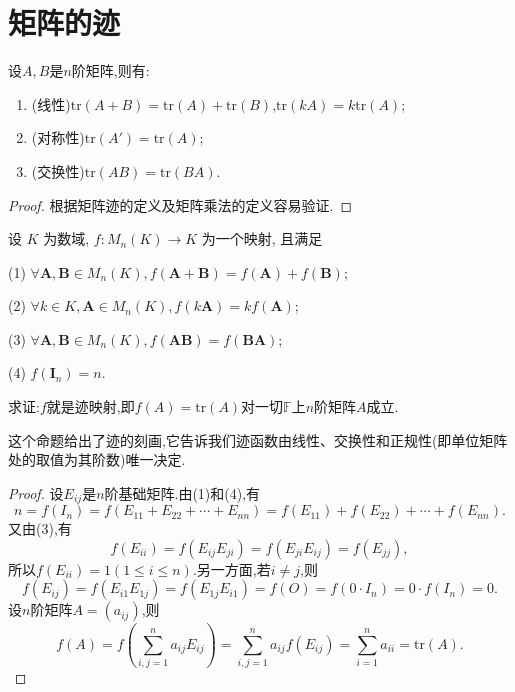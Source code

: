 \documentclass[../../main.tex]{subfiles}
\begin{document}
\section{矩阵的迹}

\begin{proposition}[矩阵迹的性质]\label{proposition:矩阵矩阵迹的性质}
设\(A,B\)是\(n\)阶矩阵,则有:
\begin{enumerate}
\item (线性)\(\mathrm{tr}(A + B)=\mathrm{tr}(A)+\mathrm{tr}(B)\),\(\mathrm{tr}(kA)=k\mathrm{tr}(A)\);
\item (对称性)\(\mathrm{tr}(A')=\mathrm{tr}(A)\);
\item (交换性)\(\mathrm{tr}(AB)=\mathrm{tr}(BA)\).
\end{enumerate}
\end{proposition}
\begin{proof}
根据矩阵迹的定义及矩阵乘法的定义容易验证.

\end{proof}

\begin{proposition}[矩阵迹的刻画]\label{proposition:矩阵迹的刻画}
设 \( K \) 为数域, \( f: M_n(K) \to K \) 为一个映射, 且满足

(1) \( \forall \boldsymbol{A}, \boldsymbol{B} \in M_n(K), f(\boldsymbol{A} + \boldsymbol{B}) = f(\boldsymbol{A}) + f(\boldsymbol{B}) \);

(2) \( \forall k \in K, \boldsymbol{A} \in M_n(K), f(k\boldsymbol{A}) = kf(\boldsymbol{A}) \);

(3) \( \forall \boldsymbol{A}, \boldsymbol{B} \in M_n(K), f(\boldsymbol{AB}) = f(\boldsymbol{BA}) \);

(4) \( f(\boldsymbol{I}_n) = n \).

求证:\(f\)就是迹映射,即\(f(A)=\mathrm{tr}(A)\)对一切\(\mathbb{F}\)上\(n\)阶矩阵\(A\)成立.
\end{proposition}
\begin{note}
这个命题给出了迹的刻画,它告诉我们迹函数由线性、交换性和正规性(即单位矩阵处的取值为其阶数)唯一决定.
\end{note}
\begin{proof}
设\(E_{ij}\)是\(n\)阶基础矩阵.由(1)和(4),有
\[
n = f(I_n)=f(E_{11}+E_{22}+\cdots+E_{nn})=f(E_{11})+f(E_{22})+\cdots+f(E_{nn}).
\]
又由(3),有
\[
f(E_{ii})=f(E_{ij}E_{ji})=f(E_{ji}E_{ij})=f(E_{jj}),
\]
所以\(f(E_{ii}) = 1(1\leqslant  i\leqslant  n)\).另一方面,若\(i\neq j\),则
\[
f(E_{ij})=f(E_{i1}E_{1j})=f(E_{1j}E_{i1})=f(O)=f(0\cdot I_n)=0\cdot f(I_n)=0.
\]
设\(n\)阶矩阵\(A=(a_{ij})\),则
\[
f(A)=f\left(\sum_{i,j = 1}^{n}a_{ij}E_{ij}\right)=\sum_{i,j = 1}^{n}a_{ij}f(E_{ij})=\sum_{i = 1}^{n}a_{ii}=\mathrm{tr}(A).
\]

\end{proof}
\end{document}
